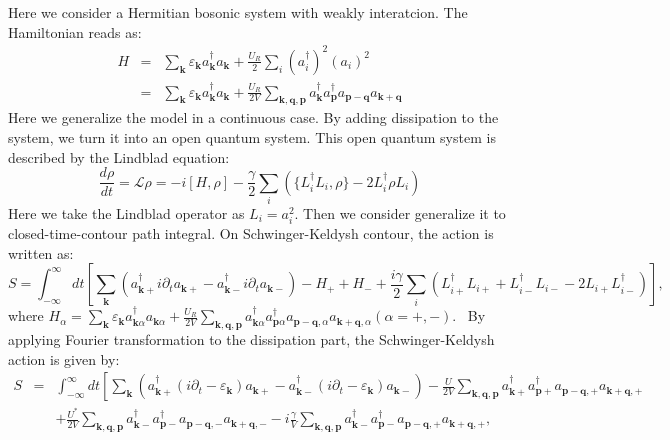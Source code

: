 \documentclass{article}
\newcommand{\tmmathbf}[1]{\ensuremath{\boldsymbol{#1}}}
\begin{document}
Here we consider a Hermitian bosonic system with weakly interatcion. The
Hamiltonian reads as:
\begin{eqnarray}
  H & = & \sum_{\tmmathbf{k}} \varepsilon_{\tmmathbf{k}}
  a_{\tmmathbf{k}}^{\dagger} a_{\tmmathbf{k}} + \frac{U_R}{2} \sum_i
  (a_i^{\dagger})^2 (a_i)^2 \nonumber\\
  & = & \sum_{\tmmathbf{k}} \varepsilon_{\tmmathbf{k}}
  a_{\tmmathbf{k}}^{\dagger} a_{\tmmathbf{k}} + \frac{U_R}{2 V}
  \sum_{\tmmathbf{k}, \tmmathbf{q}, \tmmathbf{p}} a_{\tmmathbf{k}}^{\dagger}
  a_{\tmmathbf{p}}^{\dagger} a_{\tmmathbf{p}-\tmmathbf{q}}
  a_{\tmmathbf{k}+\tmmathbf{q}} \label{Hamiltonian} 
\end{eqnarray}
Here we generalize the model in a continuous case. By adding dissipation to
the system, we turn it into an open quantum system. This open quantum system
is described by the Lindblad equation:
\begin{equation}
  \frac{d \rho}{d t} =\mathcal{L} \rho = - i [H, \rho] - \frac{\gamma}{2}
  \sum_i (\{ L_i^{\dagger} L_i, \rho \} - 2 L_i^{\dagger} \rho L_i)
  \label{Lindbland}
\end{equation}
Here we take the Lindblad operator as $L_i = a_i^2$. Then we consider
generalize it to closed-time-contour path integral. On Schwinger-Keldysh
contour, the action is written as:
\begin{equation}
  S = \int_{- \infty}^{\infty} d t \left[ \sum_{\tmmathbf{k}}
  (a^{\dagger}_{\tmmathbf{k}+} i \partial_t a_{\tmmathbf{k}+} -
  a^{\dagger}_{\tmmathbf{k}-} i \partial_t a_{\tmmathbf{k}-}) - H_+ + H_- +
  \frac{i \gamma}{2} \sum_i (L_{i +}^{\dagger} L_{i +} + L_{i -}^{\dagger}
  L_{i -} - 2 L_{i +} L_{i -}^{\dagger}) \right],
\end{equation}
where $H_{\alpha} = \sum_{\tmmathbf{k}} \varepsilon_{\tmmathbf{k}}
a_{\tmmathbf{k} \alpha}^{\dagger} a_{\tmmathbf{k} \alpha} + \frac{U_R}{2 V}
\sum_{\tmmathbf{k}, \tmmathbf{q}, \tmmathbf{p}} a_{\tmmathbf{k}
\alpha}^{\dagger} a_{\tmmathbf{p} \alpha}^{\dagger}
a_{\tmmathbf{p}-\tmmathbf{q}, \alpha} a_{\tmmathbf{k}+\tmmathbf{q}, \alpha}
(\alpha = +, -)$. \ By applying Fourier transformation to the dissipation
part, the Schwinger-Keldysh action is given by:
\begin{eqnarray}
  S & = & \int_{- \infty}^{\infty} d t \left[ \sum_{\tmmathbf{k}}
  (a^{\dagger}_{\tmmathbf{k}+} (i \partial_t - \varepsilon_{\tmmathbf{k}})
  a_{\tmmathbf{k}+} - a^{\dagger}_{\tmmathbf{k}-} (i \partial_t -
  \varepsilon_{\tmmathbf{k}}) a_{\tmmathbf{k}-}) - \frac{U}{2 V}
  \sum_{\tmmathbf{k}, \tmmathbf{q}, \tmmathbf{p}} a_{\tmmathbf{k}+}^{\dagger}
  a_{\tmmathbf{p}+}^{\dagger} a_{\tmmathbf{p}-\tmmathbf{q}, +}
  a_{\tmmathbf{k}+\tmmathbf{q}, +} \right. \nonumber\\
  &  & + \frac{U^{\ast}}{2 V} \sum_{\tmmathbf{k}, \tmmathbf{q}, \tmmathbf{p}}
  a_{\tmmathbf{k}-}^{\dagger} a_{\tmmathbf{p}-}^{\dagger}
  a_{\tmmathbf{p}-\tmmathbf{q}, -} a_{\tmmathbf{k}+\tmmathbf{q}, -} - i
  \frac{\gamma}{V} \sum_{\tmmathbf{k}, \tmmathbf{q}, \tmmathbf{p}}
  a_{\tmmathbf{k}-}^{\dagger} a_{\tmmathbf{p}-}^{\dagger}
  a_{\tmmathbf{p}-\tmmathbf{q}, +} a_{\tmmathbf{k}+\tmmathbf{q}, +},
\end{eqnarray}
\end{document}

